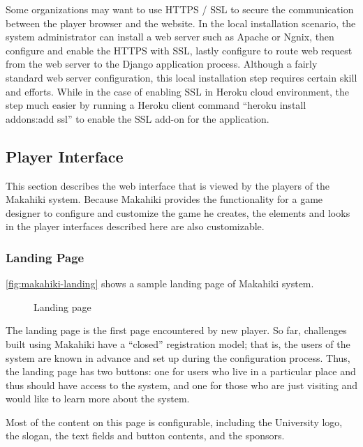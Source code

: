 Some organizations may want to use HTTPS / SSL to secure the communication between the player browser and the website. In the local installation scenario, the system administrator can install a web server such as Apache or Ngnix, then configure and enable the HTTPS with SSL, lastly configure to route web request from the web server to the Django application process. Although a fairly standard web server configuration, this local installation step requires certain skill and efforts. While in the case of enabling SSL in Heroku cloud environment, the step much easier by running a Heroku client command ``heroku install addons:add ssl'' to enable the SSL add-on for the application.

\subsection{Player Interface}

This section describes the web interface that is viewed by the players of the Makahiki system. Because Makahiki provides the functionality for a game designer to configure and customize the game he creates, the elements and looks in the player interfaces described here are also customizable. 

\subsubsection{Landing Page}
\autoref{fig:makahiki-landing} shows a sample landing page of Makahiki system.

\begin{figure}[!ht]
\begin{center}
\end{center}
\caption{Landing page}
\label{fig:makahiki-landing}
\end{figure}

The landing page is the first page encountered by new player. So far, challenges built using Makahiki have a ``closed'' registration model; that is, the users of the system are known in advance and set up during the configuration process. Thus, the landing page has two buttons: one for users who live in a particular place and thus should have access to the system, and one for those who are just visiting and would like to learn more about the system.

Most of the content on this page is configurable, including the University logo, the slogan, the text fields and button contents, and the sponsors.

